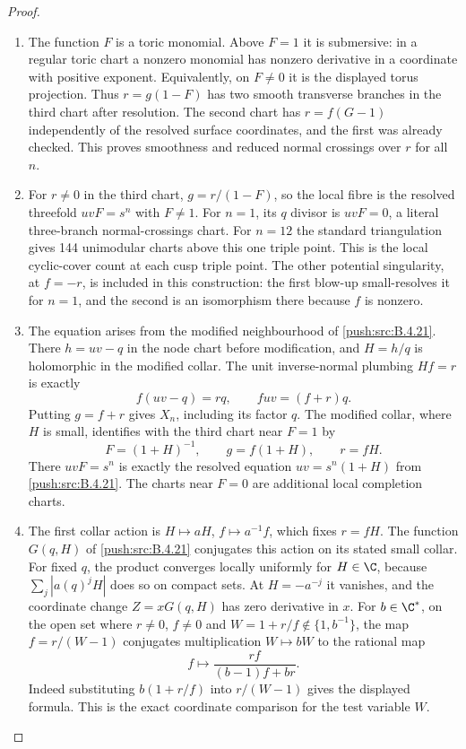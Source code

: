\begin{proof}
\begin{enumerate}[label=\arabic*.,leftmargin=*]
\item The function $F$ is a toric monomial. Above $F=1$
it is submersive: in a regular toric chart a
nonzero monomial has nonzero derivative in a
coordinate with positive exponent. Equivalently,
on $F\ne0$ it is the displayed torus projection.
Thus $r=g(1-F)$ has two smooth transverse
branches in the third chart after resolution.
The second chart has $r=f(G-1)$ independently
of the resolved surface coordinates, and the
first was already checked. This proves smoothness
and reduced normal crossings over $r$ for all $n$.

\item For $r\ne0$ in the third chart,
$g=r/(1-F)$, so the local fibre is the resolved
threefold $uvF=s^n$ with $F\ne1$.
For $n=1$, its $q$ divisor is $uvF=0$, a literal
three-branch normal-crossings chart. For $n=12$
the standard triangulation gives 144 unimodular
charts above this one triple point. This is the
local cyclic-cover count at each cusp triple point. The other
potential singularity, at $f=-r$, is included
in this construction: the first blow-up small-resolves it
for $n=1$, and the second is an isomorphism there
because $f$ is nonzero.

\item The equation arises from the modified neighbourhood of \ref{push:src:B.4.21}. There $h=uv-q$ in the
node chart before modification, and $H=h/q$ is holomorphic
in the modified collar. The unit inverse-normal plumbing
$Hf=r$ is exactly
\[
 f(uv-q)=rq,
 \qquad fuv=(f+r)q.
\]
Putting $g=f+r$ gives $X_n$, including its factor $q$.
The modified collar, where $H$ is small,
identifies with the third chart near $F=1$ by
\[
 F=(1+H)^{-1},\qquad g=f(1+H),\qquad r=fH.
\]
There $uvF=s^n$ is exactly the resolved equation
$uv=s^n(1+H)$ from \ref{push:src:B.4.21}. The charts near $F=0$
are additional local completion charts.


\item The first collar action is $H\mapsto aH$, $f\mapsto a^{-1}f$,
which fixes $r=fH$. The function $G(q,H)$ of \ref{push:src:B.4.21}
conjugates this action on its stated small collar. For fixed $q$,
the product converges locally uniformly for $H\in\C$, because
$\sum_j|a(q)^jH|$ does so on compact sets. At $H=-a^{-j}$ it
vanishes, and the coordinate change $Z=xG(q,H)$ has zero derivative
in $x$. For $b\in\C^*$, on the open set where $r\ne0$, $f\ne0$ and
$W=1+r/f\notin\{1,b^{-1}\}$, the map $f=r/(W-1)$ conjugates
multiplication $W\mapsto bW$ to the rational map
\[
 f\longmapsto\frac{rf}{(b-1)f+br}.
\]
Indeed substituting $b(1+r/f)$ into $r/(W-1)$ gives the displayed
formula. This is the exact coordinate comparison for the test variable $W$.
\end{enumerate}
\end{proof}